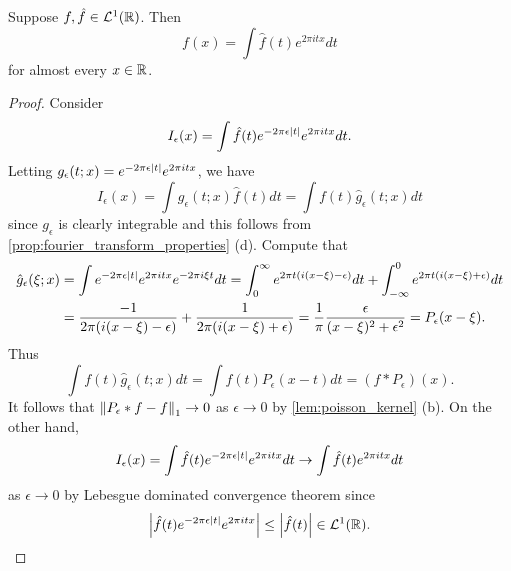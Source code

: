 \begin{theorem}
    Suppose $f,\hat{f}\in\mathcal{L}^1(\mathbb{R})$. Then
    \begin{equation*}
        f(x) = \int \hat{f}(t)e^{2\pi itx}dt
    \end{equation*}
    for almost every $x\in\mathbb{R}$.
\end{theorem}
\begin{proof}
    Consider 
    \begin{equation*}
        I_\epsilon(x) = \int\hat{f}(t)e^{-2\pi\epsilon\left\lvert {t} \right\rvert}e^{2\pi itx}dt.
    \end{equation*}
    Letting $g_\epsilon(t;x) = e^{-2\pi\epsilon\left\lvert {t} \right\rvert}e^{2\pi itx}$, we have 
    \begin{equation*}
        I_\epsilon(x) = \int g_\epsilon(t;x)\hat{f}(t)dt = \int f(t)\hat{g}_\epsilon(t;x)dt
    \end{equation*}
    since $g_\epsilon$ is clearly integrable and this follows from 
    \cref{prop:fourier_transform_properties} (d). Compute that 
    \begin{equation*}
        \begin{split}
            \hat{g}_\epsilon(\xi;x) &= \int e^{-2\pi\epsilon\left\lvert {t} \right\rvert}e^{2\pi itx}e^{-2\pi i\xi t}dt 
            = \int_0^\infty e^{2\pi t(i(x-\xi)-\epsilon)}dt + \int_{-\infty}^0 e^{2\pi t(i(x-\xi)+\epsilon)}dt \\ 
            &= \frac{-1}{2\pi(i(x-\xi)-\epsilon)} + \frac{1}{2\pi(i(x-\xi)+\epsilon)} 
            = \frac{1}{\pi}\frac{\epsilon}{(x-\xi)^2+\epsilon^2} = P_\epsilon(x-\xi).
        \end{split}
    \end{equation*}
    Thus 
    \begin{equation*}
        \int f(t)\hat{g}_\epsilon(t;x)dt = \int f(t)P_\epsilon(x-t)dt = (f*P_\epsilon)(x).
    \end{equation*}
    It follows that $\left\lVert {P_\epsilon*f - f} \right\rVert_1\to 0$ as $\epsilon\to 0$ by
    \cref{lem:poisson_kernel} (b). On the other hand, 
    \begin{equation*}
        I_\epsilon(x) = \int \hat{f}(t)e^{-2\pi\epsilon\left\lvert {t} \right\rvert}e^{2\pi itx}dt
        \to \int \hat{f}(t)e^{2\pi itx}dt
    \end{equation*}
    as $\epsilon\to 0$ by Lebesgue dominated convergence theorem since 
    \begin{equation*}
        \left\lvert {\hat{f}(t)e^{-2\pi\epsilon\left\lvert {t} \right\rvert}e^{2\pi itx}} \right\rvert\leq \left\lvert {\hat{f}(t)} \right\rvert\in\mathcal{L}^1(\mathbb{R}).
    \end{equation*}
\end{proof}